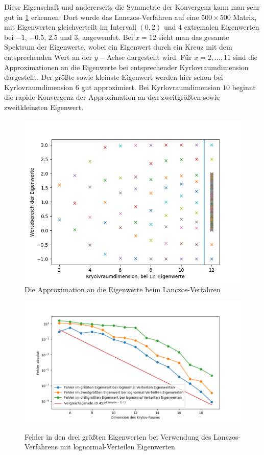 \documentclass{article}
\begin{document}
\begin{theorem}
Diese Eigenschaft und andererseits die Symmetrie der Konvergenz kann man sehr gut in \ref{eigv_lanczos} erkennen. Dort wurde das Lanczos-Verfahren auf eine $500 \times 500$ Matrix, mit Eigenwerten gleichverteilt im Intervall $(0,2)$ und $4$ extremalen Eigenwerten bei $-1$, $-0.5$, $2.5$ und $3$, angewendet. Bei $x = 12$ sieht man das gesamte Spektrum der Eigenwerte, wobei ein Eigenwert durch ein Kreuz mit dem entsprechenden Wert an der $y-$Achse dargestellt wird. Für $x = 2,...,11$ sind die Approximationen an die Eigenwerte bei entsprechender Kyrlovraumdimension dargestellt. Der größte sowie kleinste Eigenwert werden hier schon bei Kyrlovraumdimension $6$ gut approximiert. Bei Kyrlovraumdimension $10$ beginnt die rapide Konvergenz der Approximation an den zweitgrößten sowie zweitkleinsten Eigenwert.


\begin{figure}[H]\label{eigv_lanczos}
	\begin{center}
		\includegraphics[width = 0.7 \linewidth]{Plots/eigv_kyrlov_approx}
		\caption{Die Approximation an die Eigenwerte beim Lanczos-Verfahren}
	\end{center}
\end{figure}



\begin{figure}[H]
\begin{center}
	\includegraphics[width = 0.7 \linewidth]{Plots/lanczos_lognormal}\label{lanczos_lognomal}
	\caption{Fehler in den drei größten Eigenwerten bei Verwendung des Lanczos-Verfahrens mit lognormal-Verteilen Eigenwerten}
	\end{center}
\end{figure}


\end{theorem}
\end{document}
